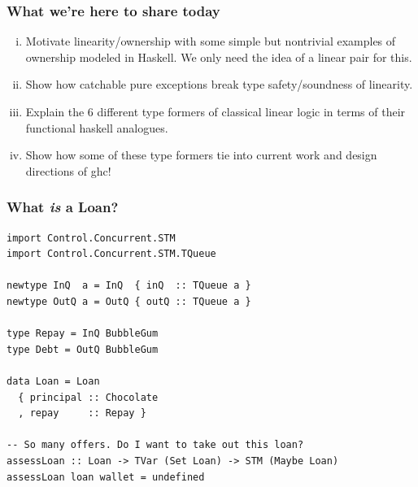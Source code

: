 \documentclass[11pt,reqno]{beamer}
\begin{document}
\begin{frame}\frametitle{What we're here to share today}
  \begin{enumerate}[(i)]
    \item Motivate linearity/ownership with some simple but nontrivial examples of ownership modeled
    in Haskell. We only need the idea of a linear pair for this.
    \item Show how catchable pure exceptions break type safety/soundness of linearity.
    \item Explain the 6 different type formers of classical linear logic in terms of
    their functional haskell analogues.
    \item Show how some of these type formers tie into current work and design directions
    of ghc!
  \end{enumerate}
\end{frame}













\begin{frame}[fragile]
\frametitle{What \emph{is} a Loan?}

\begin{verbatim}
import Control.Concurrent.STM
import Control.Concurrent.STM.TQueue

newtype InQ  a = InQ  { inQ  :: TQueue a }
newtype OutQ a = OutQ { outQ :: TQueue a }

type Repay = InQ BubbleGum
type Debt = OutQ BubbleGum

data Loan = Loan
  { principal :: Chocolate
  , repay     :: Repay }

-- So many offers. Do I want to take out this loan?
assessLoan :: Loan -> TVar (Set Loan) -> STM (Maybe Loan)
assessLoan loan wallet = undefined
\end{verbatim}
\end{frame}

\end{document}
